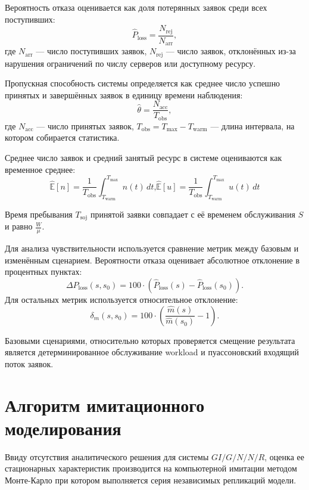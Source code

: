 Вероятность отказа оценивается как доля потерянных заявок среди всех поступивших:
$$
\widehat{P}_{\mathrm{loss}}
=
\frac{N_{\mathrm{rej}}}{N_{\mathrm{arr}}},
$$
где $N_{\mathrm{arr}}$ --- число поступивших заявок, $N_{\mathrm{rej}}$ --- число заявок, отклонённых из-за нарушения ограничений по числу серверов или доступному ресурсу.

Пропускная способность системы определяется как среднее число успешно принятых и завершённых заявок в единицу времени наблюдения:
$$
\widehat{\theta}
=
\frac{N_{\mathrm{acc}}}{T_{\mathrm{obs}}},
$$
где $N_{\mathrm{acc}}$ --- число принятых заявок, $T_{\mathrm{obs}} = T_{\max} - T_{\mathrm{warm}}$ --- длина интервала, на котором собирается статистика. 

Среднее число заявок и средний занятый ресурс в системе оцениваются как временное среднее:
$$
\widehat{\mathbb{E}}[n]=\frac{1}{T_{\mathrm{obs}}}\int_{T_{\mathrm{warm}}}^{T_{\max}} n(t)\,dt \textit{,} \widehat{\mathbb{E}}[u]=\frac{1}{T_{\mathrm{obs}}}\int_{T_{\mathrm{warm}}}^{T_{\max}} u(t)\,dt
$$ \cite{law2015_simulation_modeling}

Время пребывания $T_{\mathrm{soj}}$ принятой заявки совпадает с её временем обслуживания $S$ и равно $\frac{W}{\mu}$.

Для анализа чувствительности используется сравнение метрик между базовым и изменённым сценарием. Вероятности отказа оценивает абсолютное отклонение в процентных пунктах:
$$
\Delta P_{\mathrm{loss}}(s,s_0)=100\cdot\left(\widehat{P}_{\mathrm{loss}}(s)-\widehat{P}_{\mathrm{loss}}(s_0)\right).
$$\cite{law2015_simulation_modeling}
Для остальных метрик используется относительное отклонение:
$$
\delta_m(s,s_0)=100\cdot\left(\frac{\widehat{m}(s)}{\widehat{m}(s_0)}-1\right).
$$

Базовыми сценариями, относительно которых проверяется смещение результата является детерминированное обслуживание workload и пуассоновский входящий поток заявок.

\section{Алгоритм имитационного моделирования}
\label{sec:simulation_algorithm}

Ввиду отсутствия аналитического решения для системы $GI/G/N/N/R$, оценка ее стационарных характеристик производится на компьютерной имитации методом Монте-Карло при котором выполняется серия независимых репликаций модели.\cite{fishman1996_monte_carlo,law2015_simulation_modeling}

